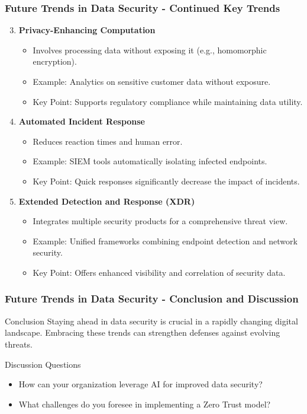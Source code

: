 \documentclass{beamer}
\begin{document}
\begin{frame}[fragile]
    \frametitle{Future Trends in Data Security - Continued Key Trends}
    \begin{enumerate}
        \setcounter{enumi}{2}
        \item \textbf{Privacy-Enhancing Computation}
            \begin{itemize}
                \item Involves processing data without exposing it (e.g., homomorphic encryption).
                \item Example: Analytics on sensitive customer data without exposure.
                \item Key Point: Supports regulatory compliance while maintaining data utility.
            \end{itemize}

        \item \textbf{Automated Incident Response}
            \begin{itemize}
                \item Reduces reaction times and human error.
                \item Example: SIEM tools automatically isolating infected endpoints.
                \item Key Point: Quick responses significantly decrease the impact of incidents.
            \end{itemize}

        \item \textbf{Extended Detection and Response (XDR)}
            \begin{itemize}
                \item Integrates multiple security products for a comprehensive threat view.
                \item Example: Unified frameworks combining endpoint detection and network security.
                \item Key Point: Offers enhanced visibility and correlation of security data.
            \end{itemize}
    \end{enumerate}
\end{frame}

\begin{frame}[fragile]
    \frametitle{Future Trends in Data Security - Conclusion and Discussion}
    \begin{block}{Conclusion}
        Staying ahead in data security is crucial in a rapidly changing digital landscape. Embracing these trends can strengthen defenses against evolving threats.
    \end{block}
    \begin{block}{Discussion Questions}
        \begin{itemize}
            \item How can your organization leverage AI for improved data security?
            \item What challenges do you foresee in implementing a Zero Trust model?
        \end{itemize}
    \end{block}
\end{frame}
\end{document}
